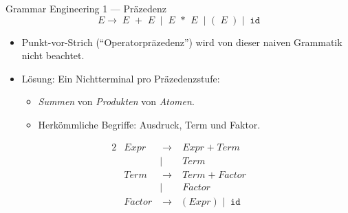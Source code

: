 \documentclass{beamer}
\begin{document}
\begin{frame}{Grammar Engineering 1 --- Präzedenz}
  \begin{equation*}
    E \to \; E \;\; \texttt{+} \;\; E \;
     \mid \; E \;\; \texttt{*} \;\; E \;
     \mid \; \texttt{(} \;\; E \;\; \texttt{)} \;
     \mid \; \texttt{id}
  \end{equation*}

  \begin{itemize}
    \item Punkt-vor-Strich (\enquote{Operatorpräzedenz}) wird von dieser naiven Grammatik nicht beachtet.
    \item Lösung: Ein Nichtterminal pro Präzedenzstufe:
    \begin{itemize}
      \item \emph{Summen} von \emph{Produkten} von \emph{Atomen}.
      \item Herkömmliche Begriffe: Ausdruck, Term und Faktor.
    \end{itemize}
  \end{itemize}

  \begin{alignat*}{2}
    & Expr   & \; \to \; & Expr \; \texttt{+} \; Term \\
          && \mid \;\; & Term \\
    & Term   & \; \to \; & Term \; \texttt{+} \; Factor \\
            && \mid \;\; & Factor \\
    & Factor & \; \to \; & \texttt{(} \; Expr \; \texttt{)} \; \mid \; \texttt{id}
  \end{alignat*}
\end{frame}
\end{document}
